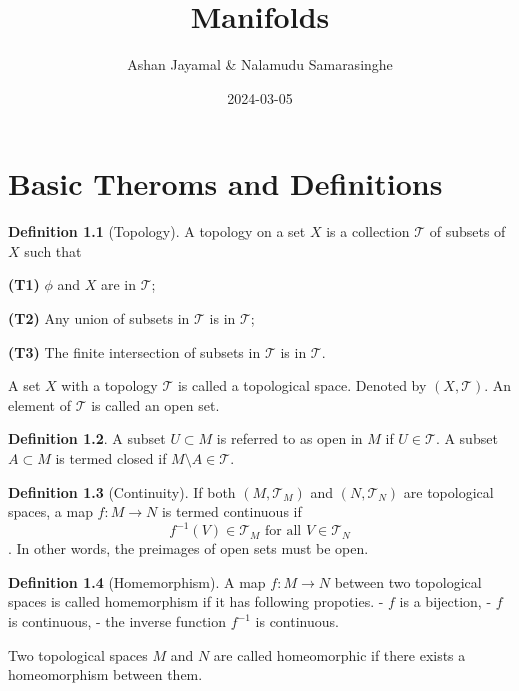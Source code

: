 \documentclass[
]{book}
\title{Manifolds}
\author{Ashan Jayamal \& Nalamudu Samarasinghe}
\date{2024-03-05}
\theoremstyle{definition}
\newtheorem{definition}{Definition}[chapter]
\theoremstyle{definition}
\theoremstyle{definition}
\theoremstyle{definition}
\theoremstyle{remark}
\begin{document}
\maketitle

{
\setcounter{tocdepth}{1}
\tableofcontents
}
\hypertarget{basic-theroms-and-definitions}{%
\chapter{Basic Theroms and Definitions}\label{basic-theroms-and-definitions}}

\begin{definition}[Topology]
\protect\hypertarget{def:Top}{}\label{def:Top}A topology on a set \(X\) is a collection \(\mathcal{T}\) of subsets of \(X\) such that

\textbf{(T1)} \(\phi\) and \(X\) are in \(\mathcal{T}\);

\textbf{(T2)} Any union of subsets in \(\mathcal{T}\) is in \(\mathcal{T}\);

\textbf{(T3)} The finite intersection of subsets in \(\mathcal{T}\) is in \(\mathcal{T}\).
\end{definition}

A set \(X\) with a topology \(\mathcal{T}\) is called a topological space. Denoted by \((X,\mathcal{T})\). An element of \(\mathcal{T}\) is called an open set.

\begin{definition}
\protect\hypertarget{def:unnamed-chunk-1}{}\label{def:unnamed-chunk-1}A subset \(U \subset M\) is referred to as open in \(M\) if \(U \in \mathcal{T}\). A subset \(A \subset M\) is termed closed if \(M \setminus A \in \mathcal{T}\).
\end{definition}

\begin{definition}[Continuity]
\protect\hypertarget{def:unnamed-chunk-2}{}\label{def:unnamed-chunk-2}If both \((M, \mathcal{T}_M)\) and \((N, \mathcal{T}_N)\) are topological spaces, a map \(f : M \rightarrow N\) is termed continuous if \[f^{-1}(V) \in \mathcal{T}_M \text{ for all } V \in \mathcal{T}_N\].
In other words, the preimages of open sets must be open.
\end{definition}

\begin{definition}[Homemorphism]
\protect\hypertarget{def:unnamed-chunk-3}{}\label{def:unnamed-chunk-3}A map \(f : M \rightarrow N\) between two topological spaces is called homemorphism if it has following propoties.
- \(f\) is a bijection,
- \(f\) is continuous,
- the inverse function \(f^{-1}\) is continuous.

Two topological spaces \(M\) and \(N\) are called homeomorphic if there exists a homeomorphism between them.
\end{definition}
\end{document}
